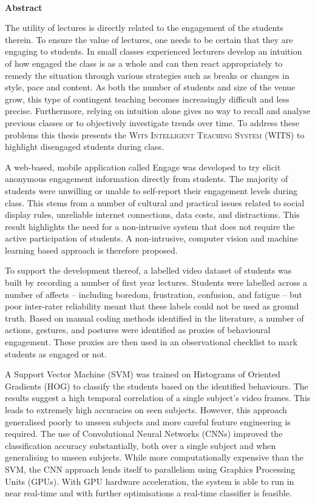 \documentclass[a4paper,twoside,12pt]{report}
\renewenvironment{abstract}{\ \vfill\begin{center}\textbf{Abstract}\end{center}\addcontentsline{toc}{section}{Abstract}}{\vfill\vfill\newpage}
\begin{document}
\begin{abstract}
\small
The utility of lectures is directly related to the engagement of the students therein.
To ensure the value of lectures, one needs to be certain that they are engaging to students.
In small classes experienced lecturers develop an intuition of how engaged the class is as a whole and can then react appropriately to remedy the situation through various strategies such as breaks or changes in style, pace and content.
As both the number of students and size of the venue grow, this type of contingent teaching becomes increasingly difficult and less precise.
Furthermore, relying on intuition alone gives no way to recall and analyse previous classes or to objectively investigate trends over time.
To address these problems this thesis presents the \textsc{Wits Intelligent Teaching System (WITS)} to highlight disengaged students during class.

A web-based, mobile application called Engage was developed to try elicit anonymous engagement information directly from students.
The majority of students were unwilling or unable to self-report their engagement levels during class.
This stems from a number of cultural and practical issues related to social display rules, unreliable internet connections, data costs, and distractions.
This result highlights the need for a non-intrusive system that does not require the active participation of students.
A non-intrusive, computer vision and machine learning based approach is therefore proposed.

To support the development thereof, a labelled video dataset of students was built by recording a number of first year lectures.
Students were labelled across a number of affects -- including boredom, frustration, confusion, and fatigue -- but poor inter-rater reliability meant that these labels could not be used as ground truth.
Based on manual coding methods identified in the literature, a number of actions, gestures, and postures were identified as proxies of behavioural engagement.
These proxies are then used in an observational checklist to mark students as engaged or not.

A Support Vector Machine (SVM) was trained on Histograms of Oriented Gradients (HOG) to classify the students based on the identified behaviours.
The results suggest a high temporal correlation of a single subject's video frames.
This leads to extremely high accuracies on seen subjects.
However, this approach generalised poorly to unseen subjects and more careful feature engineering is required.
The use of Convolutional Neural Networks (CNNs) improved the classification accuracy substantially, both over a single subject and when generalising to unseen subjects.
While more computationally expensive than the SVM, the CNN approach lends itself to parallelism using Graphics Processing Units (GPUs).
With GPU hardware acceleration, the system is able to run in near real-time and with further optimisations a real-time classifier is feasible.


\end{abstract}
\end{document}
